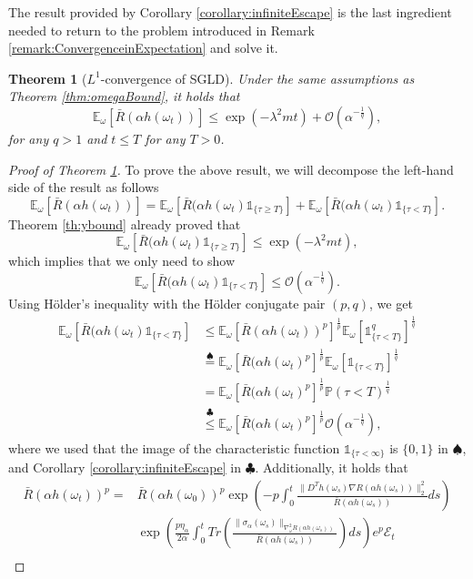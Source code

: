 \documentclass[10pt]{article} %
\newcommand{\bE}{\mathbb{E}}
\newcommand{\bP}{\mathbb{P}}
\newcommand{\cE}{\mathcal{E}}
\newcommand{\cO}{\mathcal{O}}
\newtheorem{theorem}{Theorem}
\begin{document}
The result provided by Corollary \ref{corollary:infiniteEscape} is the last ingredient needed to return to the problem introduced in Remark \ref{remark:ConvergenceinExpectation} and solve it.
\begin{theorem}[$L^1$-convergence of SGLD]\label{th:hoelder}
    Under the same assumptions as Theorem \ref{thm:omegaBound}, it holds that 
    $$\bE_\omega[\bar{R}(\alpha h(\omega_t))]\leq \exp(-\lambda^2mt)+\mathcal{O}(\alpha^{-\frac{1}{q}}),$$
    for any $q>1$ and $t \leq T$ for any $T>0$.
\end{theorem}
\begin{proof}[Proof of Theorem \ref{th:hoelder}]
    To prove the above result, we will decompose the left-hand side of the result as follows
    $$\bE_\omega[\bar{R}(\alpha h(\omega_t))]=\bE_\omega[\bar{R}(\alpha h(\omega_t)\mathds{1}_{\{\tau\geq T\}}]+\bE_\omega[\bar{R}(\alpha h(\omega_t)\mathds{1}_{\{\tau<T\}}].$$
    Theorem \ref{th:ybound} already proved that 
    $$\bE_\omega[\bar{R}(\alpha h(\omega_t)\mathds{1}_{\{\tau\geq T\}}]\leq \exp(-\lambda^2mt),$$
    which implies that we only need to show 
    $$\bE_\omega[\bar{R}(\alpha h(\omega_t)\mathds{1}_{\{\tau<T\}}]\leq \mathcal{O}(\alpha^{-\frac{1}{q}}).$$
    Using Hölder's inequality with the Hölder conjugate pair $(p,q)$, we get 
    \begin{align}
        \bE_\omega[\bar{R}(\alpha h(\omega_t)\mathds{1}_{\{\tau<T\}}]&\leq \bE_\omega[\bar{R}(\alpha h(\omega_t))^p]^\frac{1}{p}\bE_\omega[\mathds{1}_{\{\tau<T\}}^q]^\frac{1}{q}\\
        &\overset{\spadesuit}{=}\bE_\omega[\bar{R}(\alpha h(\omega_t)^p]^\frac{1}{p}\bE_\omega[\mathds{1}_{\{\tau<T\}}]^\frac{1}{q}\\
        &=\bE_\omega[\bar{R}(\alpha h(\omega_t)^p]^\frac{1}{p}\bP(\tau<T)^\frac{1}{q}\\
        &\overset{\clubsuit}{\leq}\bE_\omega[\bar{R}(\alpha h(\omega_t)^p]^\frac{1}{p}\cO(\alpha^{-\frac{1}{q}}),\label{equation:Hoelder}
    \end{align}
    where we used that the image of the characteristic function $\mathds{1}_{\{\tau<\infty\}}$ is $\{0,1\}$ in $\spadesuit$, and Corollary \ref{corollary:infiniteEscape} in $\clubsuit$. Additionally, it holds that
    \begin{align*}
        \bar{R}(\alpha h(\omega_t))^p=&\bar{R}(\alpha h(\omega_0))^p \exp\left(-p\int_0^t\frac{\|D^Th(\omega_s)\nabla R(\alpha h(\omega_s))\|_2^2}{\bar{R}(\alpha h(\omega_s))}ds\right)\\
        &\exp\left(\frac{p\eta_\alpha}{2\alpha}\int_0^tTr\left(\frac{\|\sigma_\alpha(\omega_s)\|_{\nabla^2_\omega R(\alpha h(\omega_s))}}{\bar{R}(\alpha h(\omega_s))}\right)ds\right) e^p\cE_t\\

\end{align*}
\end{proof}
\end{document}
